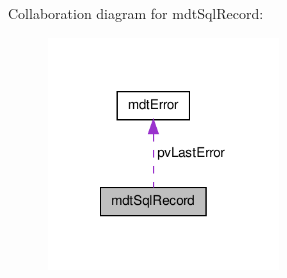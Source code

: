 Collaboration diagram for mdt\-Sql\-Record\-:\nopagebreak
\begin{figure}[H]
\begin{center}
\leavevmode
\includegraphics[width=173pt]{classmdt_sql_record__coll__graph}
\end{center}
\end{figure}
